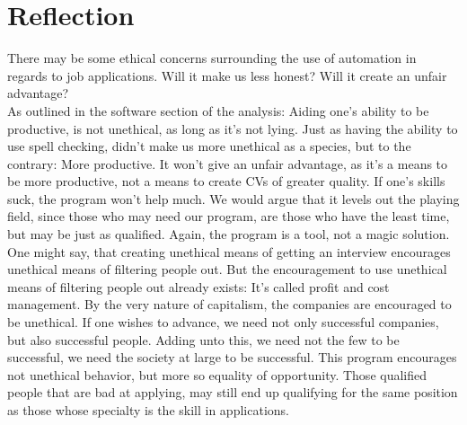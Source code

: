 \section{Reflection}
There may be some ethical concerns surrounding the use of automation in regards to job applications.
Will it make us less honest? Will it create an unfair advantage?\\
As outlined in the software section of the analysis: Aiding one's ability to be productive, is not unethical, as long as it's not lying.
Just as having the ability to use spell checking, didn't make us more unethical as a species, but to the contrary: More productive.
It won't give an unfair advantage, as it's a means to be more productive, not a means to create CVs of greater quality. If one's skills suck, the program won't help much.
We would argue that it levels out the playing field, since those who may need our program, are those who have the least time, but may be just as qualified. Again, the program is a tool, not a magic solution.\\

One might say, that creating unethical means of getting an interview encourages unethical means of filtering people out.
But the encouragement to use unethical means of filtering people out already exists:
It's called profit and cost management. By the very nature of capitalism, the companies are encouraged to be unethical.
If one wishes to advance, we need not only successful companies, but also successful people.
Adding unto this, we need not the few to be successful, we need the society at large to be successful. This program encourages not unethical behavior, but more so equality of opportunity.
Those qualified people that are bad at applying, may still end up qualifying for the same position as those whose specialty is the skill in applications.
\newpage